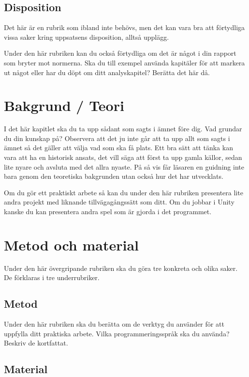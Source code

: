 \documentclass[12pt]{article}
\begin{document}
\subsection{Disposition}

Det här är en rubrik som ibland inte behövs, men det kan vara bra att förtydliga vissa saker kring uppsatsens disposition, alltså upplägg. 

Under den här rubriken kan du också förtydliga om det är något i din rapport som bryter mot normerna. Ska du till exempel använda kapitäler för att markera ut något eller har du döpt om ditt analyskapitel? Berätta det här då.

\newpage
\section{Bakgrund / Teori}

I det här kapitlet ska du ta upp sådant som sagts i ämnet före dig. Vad grundar du din kunskap på? Observera att det ju inte går att ta upp allt som sagts i ämnet så det gäller att välja vad som ska få plats. Ett bra sätt att tänka kan vara att ha en historisk ansats, det vill säga att först ta upp gamla källor, sedan lite nyare och avsluta med det allra nyaste. På så vis får läsaren en guidning inte bara genom den teoretiska bakgrunden utan också hur det har utvecklats. 

Om du gör ett praktiskt arbete så kan du under den här rubriken presentera lite andra projekt med liknande tillvägagångssätt som ditt. Om du jobbar i Unity kanske du kan presentera andra spel som är gjorda i det programmet. 


\newpage
\section{Metod och material}

Under den här övergripande rubriken ska du göra tre konkreta och olika saker. De förklaras i tre underrubriker. 


\subsection{Metod}

Under den här rubriken ska du berätta om de verktyg du använder för att uppfylla ditt praktiska arbete. Vilka programmeringsspråk ska du använda? Beskriv de kortfattat.


\subsection{Material}
\end{document}
